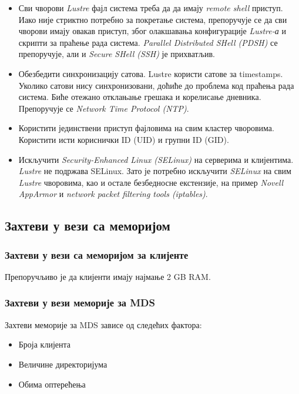 \begin{itemize}
\item Сви чворови   \textit{Lustre} фајл система треба да да имају \textit{remote shell} приступ. Иако није стриктно потребно за покретање система, препоручује се да сви чворови имају овакав приступ, због олакшавања конфигурације \textit{Lustre-а} и скрипти за праћење рада система. \textit{Parallel Distributed SHell (\gls{PDSH})} се препоручује, али и \textit{Secure SHell (SSH)} је прихватљив.

\item Обезбедити синхронизацију сатова. Lustre користи сатове за timestamps. Уколико сатови нису синхронизовани, доћиће до проблема код праћења рада система. Биће отежано отклањање грешака  и корелисање дневника. Препоручује се  \textit{Network Time Protocol (\gls{NTP})}.

\item Користити јединствени приступ фајловима на свим кластер чворовима. Користити исти кориснички ID (UID) и групни ID (GID). 

\item Искључити  \textit{Security-Enhanced Linux (\gls{SELinux})} на серверима и клијентима.   \textit{Lustre}  не подржава SELinux. Зато је потребно искључити \textit{SELinux} на свим   \textit{Lustre} чворовима, као и остале безбедносне екстензије, на пример \textit{Novell AppArmor} и \textit{network packet filtering tools (iptables)}.
\end{itemize}

\subsection{Захтеви у вези са меморијом} 

\subsubsection{Захтеви у вези са меморијом за клијенте}

Препоручљиво је да клијенти имају најмање 2 GB RAM.

\subsubsection{Захтеви у вези меморије за MDS}

Захтеви меморије за MDS зависе од следећих фактора:

\begin{itemize}

\item Броја клијента

\item Величине директоријума

\item Обима оптерећења
\end{itemize}

